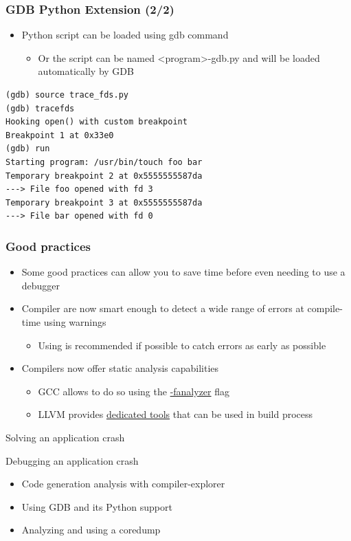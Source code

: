 \begin{frame}[fragile]
  \frametitle{GDB Python Extension (2/2)}
  \begin{itemize}
    \item Python script can be loaded using gdb  command
    \begin{itemize}
      \item Or the script can be named <program>-gdb.py and will be loaded automatically by GDB
    \end{itemize}
  \end{itemize}
  \begin{block}{}
    \begin{verbatim}
(gdb) source trace_fds.py 
(gdb) tracefds 
Hooking open() with custom breakpoint
Breakpoint 1 at 0x33e0
(gdb) run
Starting program: /usr/bin/touch foo bar
Temporary breakpoint 2 at 0x5555555587da
---> File foo opened with fd 3
Temporary breakpoint 3 at 0x5555555587da
---> File bar opened with fd 0
    \end{verbatim}
  \end{block}
\end{frame}

\begin{frame}
  \frametitle{Good practices}
  \begin{itemize}
    \item Some good practices can allow you to save time before even needing to
          use a debugger
    \item Compiler are now smart enough to detect a wide range of errors at
          compile-time using warnings
    \begin{itemize}
      \item Using  is recommended if possible to catch
            errors as early as possible
    \end{itemize}
    \item Compilers now offer static analysis capabilities
    \begin{itemize}
      \item GCC allows to do so using the \href{https://gcc.gnu.org/onlinedocs/gcc-11.1.0/gcc/Static-Analyzer-Options.html}{-fanalyzer} flag
      \item LLVM provides \href{https://clang-analyzer.llvm.org/command-line.html}{dedicated tools} that can be used in build process
    \end{itemize}
  \end{itemize}
\end{frame}

\setuplabframe
{Solving an application crash}
{
  Debugging an application crash
  \begin{itemize}
    \item Code generation analysis with compiler-explorer
    \item Using GDB and its Python support
    \item Analyzing and using a coredump
  \end{itemize}
}
